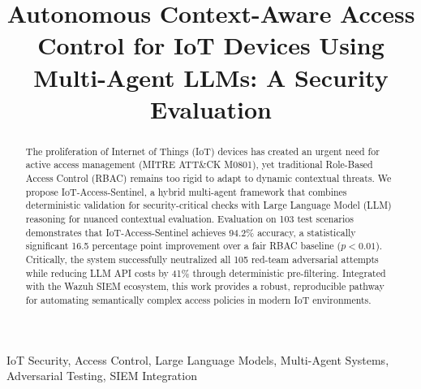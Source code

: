 \documentclass[conference]{IEEEtran}
\begin{document}
\title{Autonomous Context-Aware Access Control for IoT Devices Using Multi-Agent LLMs: A Security Evaluation}

\author{
    \and
    \and
}

\maketitle

\begin{abstract}
    The proliferation of Internet of Things (IoT) devices has created an urgent need for active access management (MITRE ATT\&CK M0801), yet traditional Role-Based Access Control (RBAC) remains too rigid to adapt to dynamic contextual threats. We propose IoT-Access-Sentinel, a hybrid multi-agent framework that combines deterministic validation for security-critical checks with Large Language Model (LLM) reasoning for nuanced contextual evaluation. Evaluation on 103 test scenarios demonstrates that IoT-Access-Sentinel achieves 94.2\% accuracy, a statistically significant 16.5 percentage point improvement over a fair RBAC baseline ($p < 0.01$). Critically, the system successfully neutralized all 105 red-team adversarial attempts while reducing LLM API costs by 41\% through deterministic pre-filtering. Integrated with the Wazuh SIEM ecosystem, this work provides a robust, reproducible pathway for automating semantically complex access policies in modern IoT environments.
\end{abstract}

\begin{IEEEkeywords}
    IoT Security, Access Control, Large Language Models, Multi-Agent Systems, Adversarial Testing, SIEM Integration
\end{IEEEkeywords}
\end{document}
